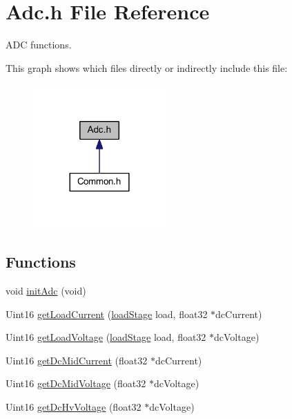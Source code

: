 \hypertarget{a00012}{\section{Adc.\-h File Reference}
\label{a00012}
}


A\-D\-C functions.  


This graph shows which files directly or indirectly include this file\-:\nopagebreak
\begin{figure}[H]
\begin{center}
\leavevmode
\includegraphics[width=144pt]{a00059}
\end{center}
\end{figure}
\subsection*{Functions}
\begin{DoxyCompactItemize}
\item 
void \hyperlink{a00012_a99fb31efe14a1f6f9cf3e4a642ebbae3}{init\-Adc} (void)
\item 
Uint16 \hyperlink{a00012_a28f0815ea5d750d31a3fb48fbfa94bdb}{get\-Load\-Current} (\hyperlink{a00027_a2820f1e18d921d2f1e97d53404b9fbae}{load\-Stage} load, float32 $\ast$dc\-Current)
\item 
Uint16 \hyperlink{a00012_a6e88fe2ebb2218ff8218996b0fde656f}{get\-Load\-Voltage} (\hyperlink{a00027_a2820f1e18d921d2f1e97d53404b9fbae}{load\-Stage} load, float32 $\ast$dc\-Voltage)
\item 
Uint16 \hyperlink{a00012_a7ed34e388fa9d521c6005c3fc9007c92}{get\-Dc\-Mid\-Current} (float32 $\ast$dc\-Current)
\item 
Uint16 \hyperlink{a00012_acb69b24f66dd6b4dacf6a87c0933d8d4}{get\-Dc\-Mid\-Voltage} (float32 $\ast$dc\-Voltage)
\item 
Uint16 \hyperlink{a00012_a5ba3e16114b94a0b9bb26bbaa49e8242}{get\-Dc\-Hv\-Voltage} (float32 $\ast$dc\-Voltage)
\end{DoxyCompactItemize}
